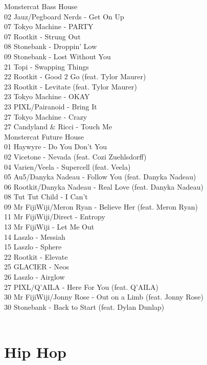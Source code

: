 \begin{multicols}{2}
 \large Monstercat Bass House \normalsize\\
 02 Jauz/Pegboard Nerds - Get On Up\\ 07 Tokyo Machine - PARTY\\ 07 Rootkit - Strung Out\\ 08 Stonebank - Droppin' Low\\ 09 Stonebank - Lost Without You\\ 21 Topi - Swapping Things\\ 22 Rootkit - Good 2 Go (feat. Tylor Maurer)\\ 23 Rootkit - Levitate (feat. Tylor Maurer)\\ 23 Tokyo Machine - OKAY\\ 23 PIXL/Pairanoid - Bring It\\ 27 Tokyo Machine - Crazy\\ 27 Candyland \& Ricci - Touch Me\\
 \large Monstercat Future House \normalsize\\
 01 Haywyre - Do You Don't You\\ 02 Vicetone - Nevada (feat. Cozi Zuehlsdorff)\\ 04 Varien/Veela - Supercell (feat. Veela)\\ 05 Au5/Danyka Nadeau - Follow You (feat. Danyka Nadeau)\\ 06 Rootkit/Danyka Nadeau - Real Love (feat. Danyka Nadeau)\\ 08 Tut Tut Child - I Can't\\ 09 Mr FijiWiji/Meron Ryan - Believe Her (feat. Meron Ryan)\\ 11 Mr FijiWiji/Direct - Entropy\\ 13 Mr FijiWiji - Let Me Out\\ 14 Laszlo - Messiah\\ 15 Laszlo - Sphere\\ 22 Rootkit - Elevate\\ 25 GLACIER - Neos\\ 26 Laszlo - Airglow\\ 27 PIXL/Q'AILA - Here For You (feat. Q'AILA)\\ 30 Mr FijiWiji/Jonny Rose - Out on a Limb (feat. Jonny Rose)\\ 30 Stonebank - Back to Start (feat. Dylan Dunlap)\\
\\

\section*{Hip Hop}

\end{multicols}
